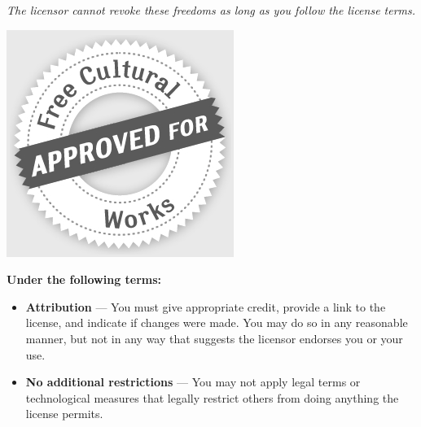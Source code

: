 {\begin{frame}[plain]
\begin{tcolorbox}[colback=my-grey,
			colframe=my-grey,  
			center, arc=0pt,outer arc=0pt,
			valign=top, 
			halign=left,
			width=\textwidth]
\begin{minipage}{0.83\textwidth}
				\textit{The licensor cannot revoke these freedoms as long as you follow the license terms.}
			\end{minipage}
			\begin{minipage}{0.15\textwidth}
				\includegraphics[width=\textwidth]{../img/licence/FreeCulturalWorks_seal_x2.jpg}
			\end{minipage}
			
			
			\begin{center}
				\bfseries\Large
				Under the following terms:
			\end{center}
			
			\begin{itemize}
				\item[] \textbf{Attribution} — You must give appropriate credit, provide a link to the license, and indicate if changes were made. You may do so in any reasonable manner, but not in any way that suggests the licensor endorses you or your use.
				\item[] \textbf{No additional restrictions} — You may not apply legal terms or technological measures that legally restrict others from doing anything the license permits.
			\end{itemize}
			
		\end{tcolorbox}
	\end{frame}
}


